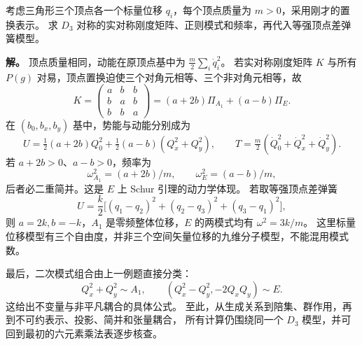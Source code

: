 \begin{workedexample}[把群结构与耦合语言用于一个完整的动力学模型]
\label{ex:d3-comprehensive-model}
考虑三角形三个顶点各一个标量位移 $q_i$，每个顶点质量为 $m>0$，采用刚才的置换表示。
求 $D_3$ 对称的实对称刚度矩阵、正则模式和频率，再代入等强顶点差弹簧模型。

\textbf{解。} 顶点质量相同，动能在原顶点基中为 $\tfrac m2\sum_i\dot q_i^2$。
若实对称刚度矩阵 $K$ 与所有 $P(g)$ 对易，顶点置换迫使三个对角元相等、三个非对角元相等，故
\[
K=\begin{pmatrix}a&b&b\\b&a&b\\b&b&a\end{pmatrix}
=(a+2b)\Pi_{A_1}+(a-b)\Pi_E.
\]
在 $(b_0,b_x,b_y)$ 基中，势能与动能分别成为
\[
U=\tfrac12(a+2b)Q_0^2+\tfrac12(a-b)(Q_x^2+Q_y^2),\qquad
T=\tfrac m2(\dot Q_0^2+\dot Q_x^2+\dot Q_y^2).
\]
若 $a+2b>0$、$a-b>0$，频率为
\[
\omega_{A_1}^2=(a+2b)/m,\qquad
\omega_E^2=(a-b)/m,
\]
后者必二重简并。这是 $E$ 上 Schur 引理的动力学体现。
若取等强顶点差弹簧
\[
U=\frac k2\bigl[(q_1-q_2)^2+(q_2-q_3)^2+(q_3-q_1)^2\bigr],
\]
则 $a=2k,b=-k$，$A_1$ 是零频整体位移，$E$ 的两模式均有 $\omega^2=3k/m$。
这里标量位移模型有三个自由度，并非三个空间矢量位移的九维分子模型，不能混用模式数。

最后，二次模式组合由上一例题直接分类：
\[
Q_x^2+Q_y^2\sim A_1,\qquad
(Q_x^2-Q_y^2,-2Q_xQ_y)\sim E.
\]
这给出不变量与非平凡耦合的具体公式。
至此，从生成关系到陪集、群作用，再到不可约表示、投影、简并和张量耦合，
所有计算仍围绕同一个 $D_3$ 模型，并可回到最初的六元素乘法表逐步核查。
\end{workedexample}
